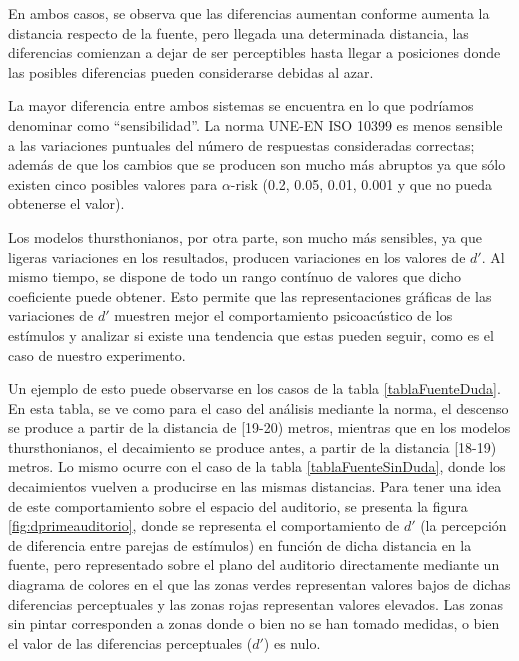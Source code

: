 \documentclass[11pt,a4paper,twoside]{book}
\begin{document}
            En ambos casos, se observa que las diferencias aumentan conforme aumenta la distancia respecto de la fuente, pero llegada una determinada distancia, las diferencias comienzan a dejar de ser perceptibles hasta llegar a posiciones donde las posibles diferencias pueden considerarse debidas al azar.
            
            La mayor diferencia entre ambos sistemas se encuentra en lo que podríamos denominar como ``sensibilidad''. La norma UNE-EN ISO 10399 es menos sensible a las variaciones puntuales del número de respuestas consideradas correctas; además de que los cambios que se producen son mucho más abruptos ya que sólo existen cinco posibles valores para $\alpha$-risk (0.2, 0.05, 0.01, 0.001 y que no pueda obtenerse el valor).
            
            Los modelos thursthonianos, por otra parte, son mucho más sensibles, ya que ligeras variaciones en los resultados, producen variaciones en los valores de $d'$. Al mismo tiempo, se dispone de todo un rango contínuo de valores que dicho coeficiente puede obtener. Esto permite que las representaciones gráficas de las variaciones de $d'$ muestren mejor el comportamiento psicoacústico de los estímulos y analizar si existe una tendencia que estas pueden seguir, como es el caso de nuestro experimento.
            
            Un ejemplo de esto puede observarse en los casos de la tabla \ref{tablaFuenteDuda}. En esta tabla, se ve como para el caso del análisis mediante la norma, el descenso se produce a partir de la distancia de [19-20) metros, mientras que en los modelos thursthonianos, el decaimiento se produce antes, a partir de la distancia [18-19) metros. Lo mismo ocurre con el caso de la tabla \ref{tablaFuenteSinDuda}, donde los decaimientos vuelven a producirse en las mismas distancias. Para tener una idea de este comportamiento sobre el espacio del auditorio, se presenta la figura \ref{fig:dprimeauditorio}, donde se representa el comportamiento de $d'$ (la percepción de diferencia entre parejas de estímulos) en función de dicha distancia en la fuente, pero representado sobre el plano del auditorio directamente mediante un diagrama de colores en el que las zonas verdes representan valores bajos de dichas diferencias perceptuales y las zonas rojas representan valores elevados. Las zonas sin pintar corresponden a zonas donde o bien no se han tomado medidas, o bien el valor de las diferencias perceptuales ($d'$) es nulo.
            
\end{document}
